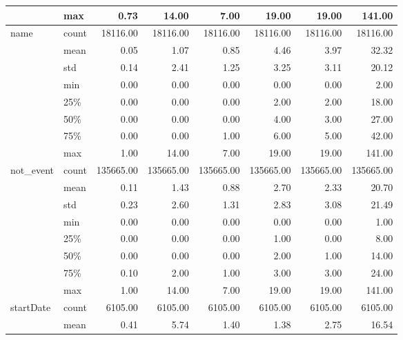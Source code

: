 \begin{table}[h]
\begin{center}
\begin{tabular}{llrrrrrr}
            & max &         0.73 &      14.00 &       7.00 &      19.00 &      19.00 &     141.00 \\
\midrule
name & count &     18116.00 &   18116.00 &   18116.00 &   18116.00 &   18116.00 &   18116.00 \\
            & mean &         0.05 &       1.07 &       0.85 &       4.46 &       3.97 &      32.32 \\
            & std &         0.14 &       2.41 &       1.25 &       3.25 &       3.11 &      20.12 \\
            & min &         0.00 &       0.00 &       0.00 &       0.00 &       0.00 &       2.00 \\
            & 25\% &         0.00 &       0.00 &       0.00 &       2.00 &       2.00 &      18.00 \\
            & 50\% &         0.00 &       0.00 &       0.00 &       4.00 &       3.00 &      27.00 \\
            & 75\% &         0.00 &       0.00 &       1.00 &       6.00 &       5.00 &      42.00 \\
            & max &         1.00 &      14.00 &       7.00 &      19.00 &      19.00 &     141.00 \\
\midrule
not\_event & count &    135665.00 &  135665.00 &  135665.00 &  135665.00 &  135665.00 &  135665.00 \\
            & mean &         0.11 &       1.43 &       0.88 &       2.70 &       2.33 &      20.70 \\
            & std &         0.23 &       2.60 &       1.31 &       2.83 &       3.08 &      21.49 \\
            & min &         0.00 &       0.00 &       0.00 &       0.00 &       0.00 &       1.00 \\
            & 25\% &         0.00 &       0.00 &       0.00 &       1.00 &       0.00 &       8.00 \\
            & 50\% &         0.00 &       0.00 &       0.00 &       2.00 &       1.00 &      14.00 \\
            & 75\% &         0.10 &       2.00 &       1.00 &       3.00 &       3.00 &      24.00 \\
            & max &         1.00 &      14.00 &       7.00 &      19.00 &      19.00 &     141.00 \\
\midrule
startDate & count &      6105.00 &    6105.00 &    6105.00 &    6105.00 &    6105.00 &    6105.00 \\
            & mean &         0.41 &       5.74 &       1.40 &       1.38 &       2.75 &      16.54 \\

\end{tabular}
\end{center}
\end{table}

